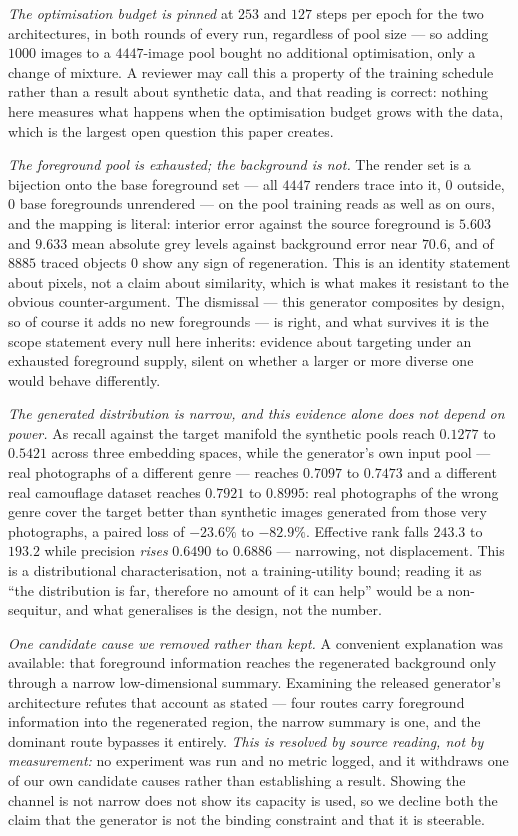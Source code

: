 \documentclass{article} %
\begin{document}
\emph{The optimisation budget is pinned} at $253$ and $127$ steps per epoch for the two
architectures, in both rounds of every run, regardless of pool size --- so adding $1000$ images to a
$4447$-image pool bought no additional optimisation, only a change of mixture. A reviewer may call
this a property of the training schedule rather than a result about synthetic data, and that reading
is correct: nothing here measures what happens when the optimisation budget grows with the data,
which is the largest open question this paper creates.

\emph{The foreground pool is exhausted; the background is not.} The render set is a bijection onto the
base foreground set --- all $4447$ renders trace into it, $0$ outside, $0$ base foregrounds unrendered
--- on the pool training reads as well as on ours, and the mapping is literal: interior error against
the source foreground is $5.603$ and $9.633$ mean absolute grey levels against background error near
$70.6$, and of $8885$ traced objects $0$ show any sign of regeneration. This is an identity statement
about pixels, not a claim about similarity, which is what makes it resistant to the obvious
counter-argument. The dismissal --- this generator composites by design, so of course it adds no new
foregrounds --- is right, and what survives it is the scope statement every null here inherits:
evidence about targeting under an exhausted foreground supply, silent on whether a larger or more
diverse one would behave differently.

\emph{The generated distribution is narrow, and this evidence alone does not depend on power.} As
recall against the target manifold the synthetic pools reach $0.1277$ to $0.5421$ across three
embedding spaces, while the generator's own input pool --- real photographs of a different genre ---
reaches $0.7097$ to $0.7473$ and a different real camouflage dataset reaches $0.7921$ to $0.8995$: real
photographs of the wrong genre cover the target better than synthetic images generated from those very
photographs, a paired loss of $-23.6\%$ to $-82.9\%$. Effective rank falls $243.3$ to $193.2$ while
precision \emph{rises} $0.6490$ to $0.6886$ --- narrowing, not displacement. This is a distributional
characterisation, not a training-utility bound; reading it as ``the distribution is far, therefore no
amount of it can help'' would be a non-sequitur, and what generalises is the design, not the number.

\emph{One candidate cause we removed rather than kept.} A convenient explanation was available: that
foreground information reaches the regenerated background only through a narrow low-dimensional
summary. Examining the released generator's architecture refutes that account as stated --- four routes
carry foreground information into the regenerated region, the narrow summary is one, and the dominant
route bypasses it entirely. \emph{This is resolved by source reading, not by measurement:} no
experiment was run and no metric logged, and it withdraws one of our own candidate causes rather than
establishing a result. Showing the channel is not narrow does not show its capacity is used, so we
decline both the claim that the generator is not the binding constraint and that it is steerable.
\end{document}
